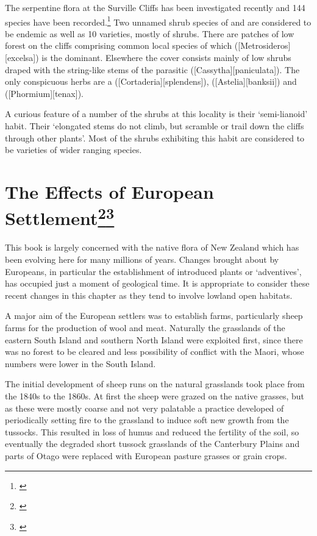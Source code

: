 The serpentine flora at the Surville Cliffs has been investigated recently and 144 species have been recorded.\footnote{\cite{druce1979indigenous}}
Two unnamed shrub species of  and  are considered to be endemic as well as 10 varieties, mostly of shrubs.
There are patches of low forest on the cliffs comprising common local species of which  ([Metrosideros][excelsa]) is the dominant.
Elsewhere the cover consists mainly of low shrubs draped with the string-like stems of the parasitic  ([Cassytha][paniculata]).
The only conspicuous herbs are a  ([Cortaderia][splendens]),  ([Astelia][banksii]) and  ([Phormium][tenax]).

A curious feature of a number of the shrubs at this locality is their `semi-lianoid' habit.
Their `elongated stems do not climb, but scramble or trail down the cliffs through other plants'.
Most of the shrubs exhibiting this habit are considered to be varieties of wider ranging species.

\section[The Effects of European Settlement]{The Effects of European Settlement\thinspace\footnote{\cite{healy1980flora}}\footnote{\cite{healy1969adventive}}}

This book is largely concerned with the native flora of New Zealand which has been evolving here for many millions of years.
Changes brought about by Europeans, in particular the establishment of introduced plants or `adventives', has occupied just a moment of geological time.
It is appropriate to consider these recent changes in this chapter as they tend to involve lowland open habitats.

A major aim of the European settlers was to establish farms, particularly sheep farms for the production of wool and meat.
Naturally the grasslands of the eastern South Island and southern North Island were exploited first, since there was no forest to be cleared and less possibility of conflict with the Maori, whose numbers were lower in the South Island.

The initial development of sheep runs on the natural grasslands took place from the 1840s to the 1860s.
At first the sheep were grazed on the native grasses, but as these were mostly coarse and not very palatable a practice developed of periodically setting fire to the grassland to induce soft new growth from the tussocks.
This resulted in loss of humus and reduced the fertility of the soil, so eventually the degraded short tussock grasslands of the Canterbury Plains and parts of Otago were replaced with European pasture grasses or grain crops.

